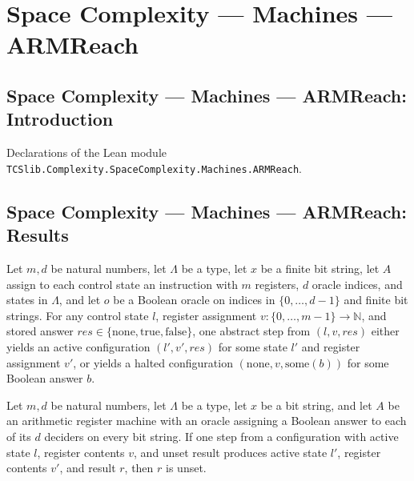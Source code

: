 \section{Space Complexity --- Machines --- ARMReach}
\subsection*{Space Complexity --- Machines --- ARMReach: Introduction}

Declarations of the Lean module \texttt{TCSlib.Complexity.SpaceComplexity.Machines.ARMReach}.

\subsection*{Space Complexity --- Machines --- ARMReach: Results}

\begin{lemma}
\label{Complexity.LogProg.astep_cases}
\leanok
{}
Let $m,d$ be natural numbers, let $\Lambda$ be a type, let $x$ be a finite bit string,
let $A$ assign to each control state an instruction with $m$ registers, $d$ oracle
indices, and states in $\Lambda$, and let $o$ be a Boolean oracle on indices in
$\{0,\ldots,d-1\}$ and finite bit strings. For any control state $l$, register
assignment $v:\{0,\ldots,m-1\}\to\mathbb N$, and stored answer
$res\in\{\mathrm{none},\mathrm{true},\mathrm{false}\}$, one abstract step from
$(l,v,res)$ either yields an active configuration $(l',v',res)$ for some state $l'$ and
register assignment $v'$, or yields a halted configuration
$(\mathrm{none},v,\mathrm{some}(b))$ for some Boolean answer $b$.
\end{lemma}

\begin{lemma}
\label{Complexity.LogProg.astep_live_res}
\leanok
{}
Let $m,d$ be natural numbers, let $\Lambda$ be a type, let $x$ be a bit string, and let
$A$ be an arithmetic register machine with an oracle assigning a Boolean answer to each
of its $d$ deciders on every bit string. If one step from a configuration with active
state $l$, register contents $v$, and unset result produces active state $l'$, register
contents $v'$, and result $r$, then $r$ is unset.
\end{lemma}


